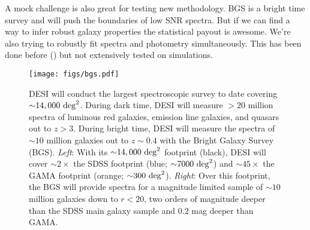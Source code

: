 A mock challenge is also great for testing new methodology.
BGS is a bright time survey and will push the boundaries of low SNR 
spectra. But if we can find a way to  infer robust galaxy properties the 
statistical payout is awesome.  
We're also trying to robustly fit spectra and photometry simultaneously. 
This has been done before () but not extensively tested 
on simulations. 


\begin{figure}
\begin{center}
\texttt{[image: figs/bgs.pdf]} 
\caption{DESI will conduct the largest spectroscopic survey to 
date covering ${\sim}14,000~{\rm deg}^2$. During dark time, DESI will measure
${>}20$ million spectra of luminous red galaxies, emission line galaxies, and 
quasars out to $z > 3$. During bright time, DESI will measure the spectra of 
${\sim}10$ million galaxies out to $z{\sim}0.4$  with the Bright Galaxy Survey (BGS).
{\em Left}: With its ${\sim}14,000~{\rm deg}^2$ footprint (black), DESI will 
cover ${\sim}2\times$ the SDSS footprint (blue; ${\sim}7000~{\rm deg}^2$) 
and ${\sim}45\times$ the GAMA footprint (orange; ${\sim}300~{\rm deg}^2$). 
{\em Right}: Over this footprint, the BGS will provide spectra for a magnitude 
limited sample of ${\sim}10$ million galaxies down to $r < 20$, two orders of 
magnitude deeper than the SDSS main galaxy sample and $0.2$ mag deeper than GAMA.}
\label{fig:bgs}
\end{center}
\end{figure}
